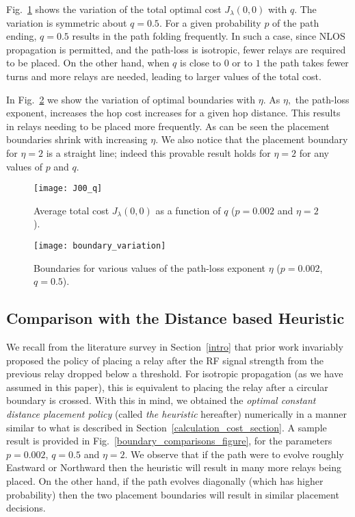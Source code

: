 \documentclass[conference]{IEEEtran}
\begin{document}
Fig.~\ref{J00_q_figure} shows the variation of the total optimal cost
$J_\lambda(0,0)$ with $q$. The variation is symmetric about
$q=0.5$. For a given probability $p$ of the path ending, $q = 0.5$
results in the path folding frequently. In such a case, since NLOS
propagation is permitted, and the path-loss is isotropic, fewer
relays are required to be placed. On the other hand, when $q$ is close
to $0$ or to $1$ the path takes fewer turns and more relays are
needed, leading to larger values of the total cost.

In Fig.~\ref{boundary_variation_figure} we show the variation of optimal boundaries with 
$\eta$. As $\eta,$ the path-loss exponent, increases the hop cost increases for a given hop 
distance. This results in relays needing to be placed more frequently. As can be seen the 
placement boundaries shrink with increasing $\eta$. We also notice that the placement boundary 
for $\eta = 2$ is a straight line; indeed this provable result holds for $\eta=2$ for any 
values of $p$ and $q$. 

\begin{figure}[t!]
\centering
\texttt{[image: J00\_q]}
\caption{Average total cost $J_{\lambda}(0,0)$ as a function of $q$ ($p=0.002$ and $\eta=2$).}
\label{J00_q_figure}
\end{figure}

\begin{figure}[t]
\centering
\texttt{[image: boundary\_variation]}
\caption{Boundaries for various values of the path-loss exponent $\eta$ ($p=0.002$, $q=0.5$).}
\label{boundary_variation_figure}
\end{figure}


\subsection{Comparison with the Distance based Heuristic}
\label{distance_heuristic_section}
We recall from the literature survey in Section~\ref{intro} that prior work invariably proposed 
the policy of placing a relay after the RF signal strength from the previous relay dropped 
below a threshold. For isotropic propagation (as we have assumed in this paper), this is 
equivalent to placing the relay after a circular boundary is crossed. With this in mind, we 
obtained the \emph{optimal constant distance placement policy} (called \emph{the heuristic} 
hereafter) numerically in a manner similar to what is described in 
Section~\ref{calculation_cost_section}. A sample result is provided in 
Fig.~\ref{boundary_comparisons_figure}, for the parameters $p=0.002$, $q=0.5$ and $\eta=2$. We 
observe that if the path were to evolve roughly Eastward or Northward then the heuristic will 
result in many more relays being placed. On the other hand, if the path evolves diagonally 
(which has higher probability) then the two placement boundaries will result in similar 
placement decisions. 
\end{document}
